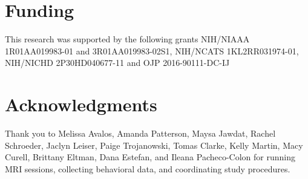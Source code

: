 \documentclass{article}%
\begin{document}
\section*{Funding}
This research was supported by the following grants NIH/NIAAA 1R01AA019983-01 and 3R01AA019983-02S1, NIH/NCATS 1KL2RR031974-01, 
NIH/NICHD 2P30HD040677-11 and OJP 2016-90111-DC-IJ


\section*{Acknowledgments}
Thank you to Melissa Avalos, Amanda Patterson, Maysa Jawdat, Rachel Schroeder, Jaclyn Leiser, Paige Trojanowski, Tomas Clarke, Kelly Martin, Macy Curell, Brittany Eltman, Dana Estefan, and Ileana Pacheco-Colon for running MRI sessions, collecting behavioral data, and coordinating study procedures. 
\end{document}
